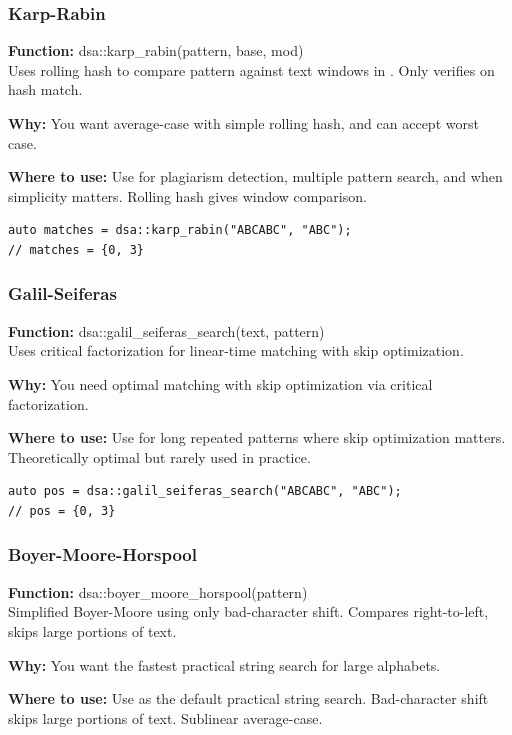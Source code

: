 \documentclass[11pt]{article}
\begin{document}
\subsubsection{Karp-Rabin}
\textbf{Function:} dsa::karp\_rabin(pattern, base, mod)\\

Uses rolling hash to compare pattern against text windows in . Only verifies on hash match.

\textbf{Why:} You want average-case with simple rolling hash, and can accept worst case. \par \textbf{Where to use:} Use for plagiarism detection, multiple pattern search, and when simplicity matters. Rolling hash gives window comparison.

\begin{lstlisting}
auto matches = dsa::karp_rabin("ABCABC", "ABC");
// matches = {0, 3}
\end{lstlisting}

\subsubsection{Galil-Seiferas}
\textbf{Function:} dsa::galil\_seiferas\_search(text, pattern)\\

Uses critical factorization for linear-time matching with skip optimization.

\textbf{Why:} You need optimal matching with skip optimization via critical factorization. \par \textbf{Where to use:} Use for long repeated patterns where skip optimization matters. Theoretically optimal but rarely used in practice.

\begin{lstlisting}
auto pos = dsa::galil_seiferas_search("ABCABC", "ABC");
// pos = {0, 3}
\end{lstlisting}

\subsubsection{Boyer-Moore-Horspool}
\textbf{Function:} dsa::boyer\_moore\_horspool(pattern)\\

Simplified Boyer-Moore using only bad-character shift. Compares right-to-left, skips large portions of text.

\textbf{Why:} You want the fastest practical string search for large alphabets. \par \textbf{Where to use:} Use as the default practical string search. Bad-character shift skips large portions of text. Sublinear average-case.
\end{document}
